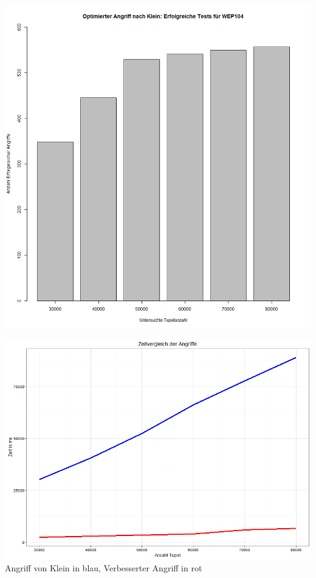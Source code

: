 \documentclass[10pt,a4paper]{article}
\begin{document}
\includegraphics[width=\textwidth]{img/WEP_104_erfolgreich.png}
\label{fig:wep100_suc}
\newpage

\includegraphics[width=\textwidth]{img/vergleich.png}
\label{fig:vergleich}
\\
Angriff von Klein in blau, Verbesserter Angriff in rot

\newpage

\nocite{*}
\printbibliography
\end{document}
